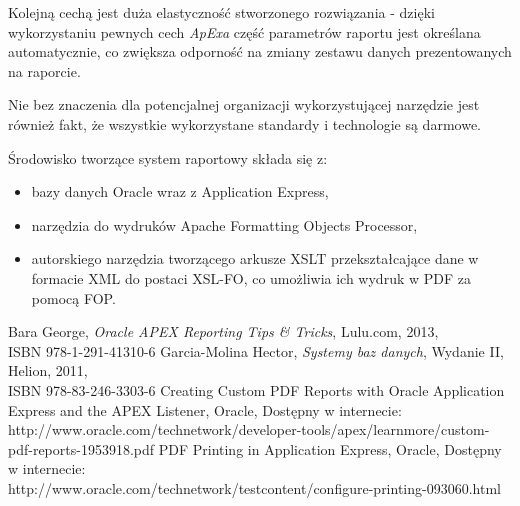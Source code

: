 \documentclass[11pt,a4paper]{article}
\begin{document}
Kolejną cechą jest duża elastyczność stworzonego rozwiązania - dzięki wykorzystaniu pewnych cech \emph{ApExa} część parametrów raportu jest określana automatycznie, co zwiększa odporność na zmiany zestawu danych prezentowanych na raporcie. 

Nie bez znaczenia dla potencjalnej organizacji wykorzystującej narzędzie jest również fakt, że wszystkie wykorzystane standardy i technologie są darmowe. 

\bigskip
Środowisko tworzące system raportowy składa się z:
\begin{itemize}
	\item bazy danych Oracle wraz z Application Express,
	\item narzędzia do wydruków Apache Formatting Objects Processor,
	\item autorskiego narzędzia tworzącego arkusze XSLT przekształcające dane w formacie XML do postaci XSL-FO, co umożliwia ich wydruk w PDF za pomocą FOP.
\end{itemize}

\newpage

\begin{thebibliography}{9}

 Bara George, \emph{Oracle APEX Reporting Tips \& Tricks}, Lulu.com, 2013,\\ISBN 978-1-291-41310-6
 Garcia-Molina Hector, \emph{Systemy baz danych}, Wydanie II, Helion, 2011,\\ ISBN 978-83-246-3303-6
 Creating Custom PDF Reports with Oracle Application Express and the APEX Listener, Oracle, Dostępny w internecie:\\http://www.oracle.com/technetwork/developer-tools/apex/learnmore/custom-pdf-reports-1953918.pdf
 PDF Printing in Application Express, Oracle, Dostępny w internecie: \\http://www.oracle.com/technetwork/testcontent/configure-printing-093060.html
\end{thebibliography}
\newpage


\appendix
\end{document}
